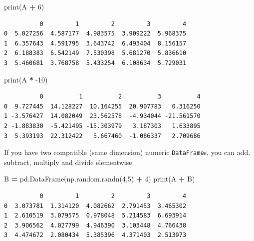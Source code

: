 \documentclass[
  letterpaper,
]{scrbook}
\newenvironment{Shaded}{\begin{snugshade}}{\end{snugshade}}
\newcommand{\BuiltInTok}[1]{#1}
\newcommand{\DecValTok}[1]{\textcolor[rgb]{0.00,0.00,0.81}{#1}}
\newcommand{\NormalTok}[1]{#1}
\newcommand{\OperatorTok}[1]{\textcolor[rgb]{0.81,0.36,0.00}{\textbf{#1}}}
\begin{document}
\begin{Shaded}
\begin{Highlighting}[]
\BuiltInTok{print}\NormalTok{(A }\OperatorTok{+} \DecValTok{6}\NormalTok{)}
\end{Highlighting}
\end{Shaded}

\begin{verbatim}
          0         1         2         3         4
0  5.027256  4.587177  4.983575  3.909222  5.968375
1  6.357643  4.591795  3.643742  6.493404  8.156157
2  6.188383  6.542149  7.530398  5.681270  5.836610
3  5.460681  3.768758  5.433254  6.108634  5.729031
\end{verbatim}

\begin{Shaded}
\begin{Highlighting}[]
\BuiltInTok{print}\NormalTok{(A }\OperatorTok{*} \DecValTok{-10}\NormalTok{)}
\end{Highlighting}
\end{Shaded}

\begin{verbatim}
          0          1          2          3          4
0  9.727445  14.128227  10.164255  20.907783   0.316250
1 -3.576427  14.082049  23.562578  -4.934044 -21.561570
2 -1.883830  -5.421495 -15.303979   3.187303   1.633895
3  5.393193  22.312422   5.667460  -1.086337   2.709686
\end{verbatim}

If you have two compatible (same dimension) numeric \texttt{DataFrame}s, you can add, subtract, multiply and divide elementwise

\begin{Shaded}
\begin{Highlighting}[]
\NormalTok{B }\OperatorTok{=}\NormalTok{ pd.DataFrame(np.random.randn(}\DecValTok{4}\NormalTok{,}\DecValTok{5}\NormalTok{) }\OperatorTok{+} \DecValTok{4}\NormalTok{)}
\BuiltInTok{print}\NormalTok{(A }\OperatorTok{+}\NormalTok{ B)}
\end{Highlighting}
\end{Shaded}

\begin{verbatim}
          0         1         2         3         4
0  3.073781  1.314120  4.082662  2.791453  3.465302
1  2.610519  3.079575  0.978048  5.214583  6.693914
2  3.906562  4.027799  4.946390  3.103448  4.766438
3  4.474672  2.080434  5.385396  4.371403  2.513973
\end{verbatim}
\end{document}
